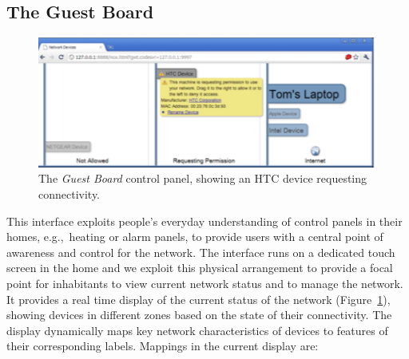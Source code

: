 



\subsection{The Guest Board}
\label{s:guest-board}


\begin{figure}
\centering
\includegraphics[width=\columnwidth]{control}
\caption{\label{f:guest-board}The \emph{Guest Board} control panel,
        showing an HTC device requesting connectivity.}
\vspace{-1em}
\end{figure}

This interface exploits people's everyday understanding of control
panels in their homes, e.g.,~heating or alarm panels, to provide users
with a central point of awareness and control for the network.  The
interface runs on a dedicated touch screen in the home and we exploit
this physical arrangement to provide a focal point for inhabitants to
view current network status and to manage the network.  It provides a
real time display of the current status of the network
(Figure~\ref{f:guest-board}), showing devices in different zones based
on the state of their connectivity.  The display dynamically maps key
network characteristics of devices to features of their corresponding
labels.  Mappings in the current display are: 

